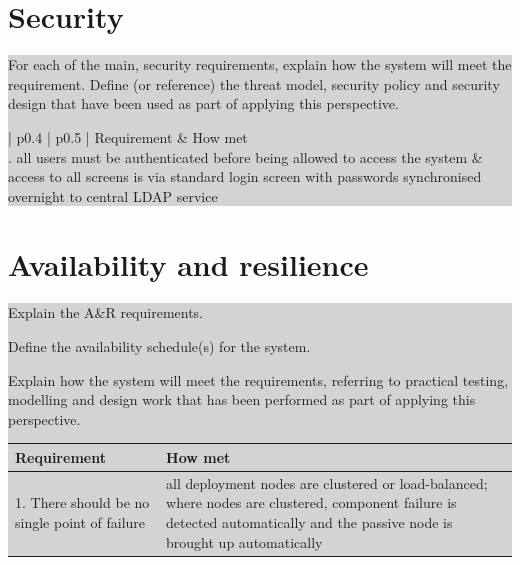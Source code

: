 \documentclass[a4paper,11pt]{report}
\newcommand{\instructions}[1]{
  \noindent\colorbox{lightgray}{%
    \parbox{\linewidth}{%
      #1
    }%
  }%
 \vspace{0.1cm}
}
\begin{document}
\section{Security}
\label{sec:security}

\instructions{
For each of the main, security requirements, explain how the system
will meet the requirement. Define (or reference) the threat model,
security policy and security design that have been used as part of
applying this perspective.

\begin{center}
  \begin{tabular}[h!]{| p{0.4\textwidth} | p{0.5\textwidth} |}
    \hline
    \rowcolor{gray}
    Requirement & How met \\
    \hline
    \hline
    1. all users must be authenticated before being allowed to access
    the system & access to all screens is via standard login screen
    with passwords synchronised overnight to central LDAP service\\

    \hline
 \end{tabular}
\end{center}

}


\section{Availability and resilience}
\label{sec:avail-resil}

\instructions{
Explain the A\&R requirements.

Define the availability schedule(s) for the system.

Explain how the system will meet the requirements, referring to
practical testing, modelling and design work that has been performed
as part of applying this perspective.

\begin{center}
  \begin{tabular}[h!]{| p{0.4\textwidth} | p{0.5\textwidth} |}
    \hline
    \rowcolor{gray}
    Requirement & How met \\
    \hline
    \hline
    1. There should be no single point of failure & all deployment
    nodes are clustered or load-balanced; where nodes are clustered,
    component failure is detected automatically and the passive node
    is brought up automatically\\

    \hline
 \end{tabular}
\end{center}

}
\end{document}
